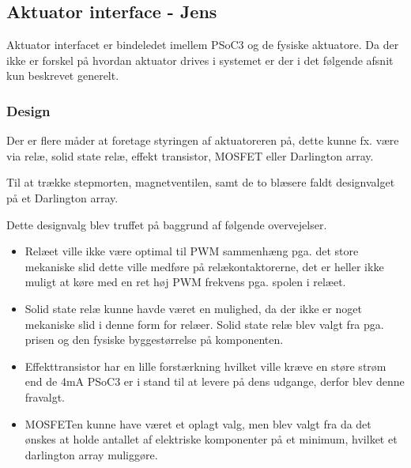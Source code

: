 \newpage
\subsection{Aktuator interface - Jens}
Aktuator interfacet er bindeledet imellem PSoC3 og de fysiske aktuatore. Da der ikke er forskel på hvordan aktuator drives i systemet er der i det følgende afsnit kun beskrevet generelt.   

\subsubsection{Design}
Der er flere måder at foretage styringen af aktuatoreren på, dette kunne fx. være via relæ, solid state relæ, effekt transistor, MOSFET eller Darlington array.  

Til at trække stepmorten, magnetventilen, samt de to blæsere faldt designvalget på et Darlington array. 

Dette designvalg blev truffet på baggrund af følgende overvejelser.
\begin{itemize}
	\item Relæet ville ikke være optimal til PWM sammenhæng pga. det store mekaniske slid dette ville medføre på relækontaktorerne, det er heller ikke muligt at køre med en ret høj PWM frekvens pga. spolen i relæet.
	\item Solid state relæ kunne havde været en mulighed, da der ikke er noget mekaniske slid i denne form for relæer. Solid state relæ blev valgt fra pga. prisen og den fysiske byggestørrelse på komponenten.
	\item Effekttransistor har en lille forstærkning hvilket ville kræve en støre strøm end de 4mA PSoC3 er i stand til at levere på dens udgange, derfor blev denne fravalgt. 
	\item MOSFETen kunne have været et oplagt valg, men blev valgt fra da det ønskes at holde antallet af elektriske komponenter på et minimum, hvilket et darlington array muliggøre. 
\end{itemize} 

